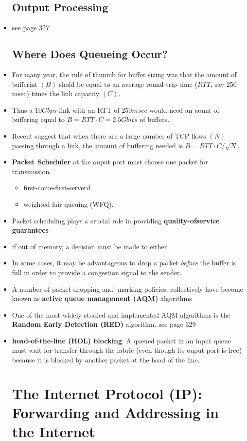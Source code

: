 \message{ !name(chapter4.tex)}\documentclass{article}
\begin{document}
\begin{itemize}
\subsection{Output Processing}
\item see page 327
\subsection{Where Does Queueing Occur?}
\item For many year, the rule of thunmb for buffer sizing was that the
  amount of bufferint $(B)$ shold be equal to an average round-trip
  time ($RTT$, say 250 msec) times the link capacity $(C)$.
\item Thus a $10 Gbps$ link with an RTT of $250 msec$ would need an
  aount of buffering equal to $B=RTT\cdot C=2.5 Gbits$ of buffers.
\item Recent suggest that when there are a large number of TCP flows
  $(N)$ passing through a link, the amount of buffering needed is
  $B=RTT\cdot C/\sqrt{N}$.
\item \textbf{Packet Scheduler} at the ouput port must choose one
  packet for transmission.
\begin{itemize}
\item first-come-first-serverd
\item weighted fair queuing (WFQ).
\end{itemize}
\item Packet scheduling plays a crucial role in providing
  \textbf{quality-ofservice guarantees}
\item if out of memory, a decision must be made to either
\begin{itemize}
\item drop the arriving packet (apolicy known as \textbf{drop-tail)
\item remove one or more already-queued packets.
\end{itemize}
\item In some cases, it may be advantageous to drop a packet
  \emph{before} the buffer is full in order to provide a congestion
  signal to the sender.
\item A number of packet-dropping and -marking policies, collectively
  have become known as \textbf{active queue management (AQM)}
  algorithms
\item One of the most widely studied and implemented AQM algorithms is
  the \textbf{Random Early Detection (RED)} algorithm. see page 329
\item \textbf{head-of-the-line (HOL) blocking}: A queued packet in an
  input queue must wait for transfer through the fabric (even though
  its ouput port is free) because it is blocked by another packet at
  the head of the line.
\section{The Internet Protocol (IP): Forwarding and Addressing in the Internet}
\end{itemize}
\end{document}
